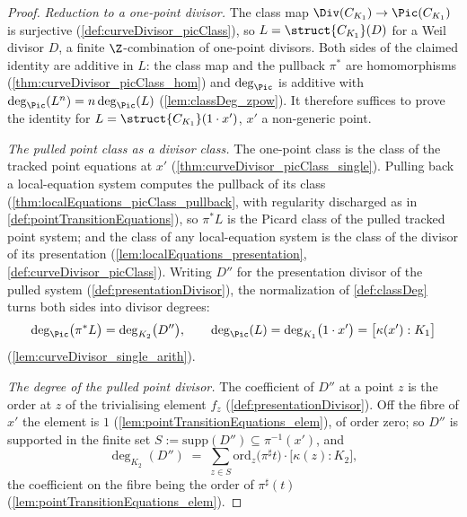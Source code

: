 \begin{proof}
  \leanok
  \emph{Reduction to a one-point divisor.} The class map
  \(\Div(C_{K_1}) \to \Pic(C_{K_1})\) is surjective (\ref{def:curveDivisor_picClass}),
  so \(L = \struct{C_{K_1}}(D)\) for a Weil divisor \(D\), a finite \(\Z\)-combination of
  one-point divisors. Both sides of the claimed identity are additive in \(L\): the
  class map and the pullback \(\pi^{*}\) are homomorphisms
  (\ref{thm:curveDivisor_picClass_hom}) and \(\deg_{\Pic}\) is additive with
  \(\deg_{\Pic}(L^n) = n\deg_{\Pic}(L)\) (\ref{lem:classDeg_zpow}). It therefore
  suffices to prove the identity for \(L = \struct{C_{K_1}}(1 \cdot x')\), \(x'\) a
  non-generic point.

  \emph{The pulled point class as a divisor class.} The one-point class is the class
  of the tracked point equations at \(x'\)
  (\ref{thm:curveDivisor_picClass_single}). Pulling back a local-equation system
  computes the pullback of its class (\ref{thm:localEquations_picClass_pullback},
  with regularity discharged as in \ref{def:pointTransitionEquations}), so
  \(\pi^{*}L\) is the Picard class of the pulled tracked point system; and the class
  of any local-equation system is the class of the divisor of its presentation
  (\ref{lem:localEquations_presentation}, \ref{def:curveDivisor_picClass}). Writing
  \(D''\) for the presentation divisor of the pulled system
  (\ref{def:presentationDivisor}), the normalization of \ref{def:classDeg} turns both
  sides into divisor degrees:
  \[
    \deg_{\Pic}\bigl(\pi^{*}L\bigr) = \deg_{K_2}\bigl(D''\bigr), \qquad
    \deg_{\Pic}(L) = \deg_{K_1}\bigl(1 \cdot x'\bigr) = \bigl[\kappa(x') : K_1\bigr]
  \]
  (\ref{lem:curveDivisor_single_arith}).

  \emph{The degree of the pulled point divisor.} The coefficient of \(D''\) at a point
  \(z\) is the order at \(z\) of the trivialising element \(f_z\)
  (\ref{def:presentationDivisor}). Off the fibre of \(x'\) the element is \(1\)
  (\ref{lem:pointTransitionEquations_elem}), of order zero; so \(D''\) is supported in
  the finite set \(S := \mathrm{supp}(D'') \subseteq \pi^{-1}(x')\), and
  \[
    \deg_{K_2}(D'') \;=\; \sum_{z \in S}
      \mathrm{ord}_z\bigl(\pi^{\sharp}t\bigr) \cdot \bigl[\kappa(z) : K_2\bigr],
  \]
  the coefficient on the fibre being the order of \(\pi^{\sharp}(t)\)
  (\ref{lem:pointTransitionEquations_elem}).


\end{proof}
